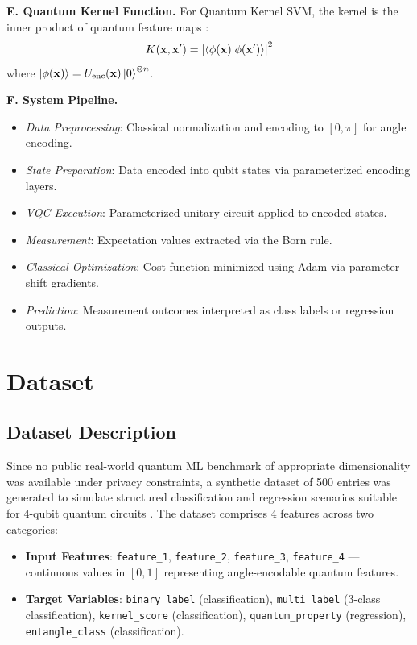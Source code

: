 \documentclass[conference]{IEEEtran}
\begin{document}
\textbf{E. Quantum Kernel Function.} For Quantum Kernel SVM, the kernel is the inner product of quantum feature maps \cite{havlicek2019}:
\[
K(\mathbf{x}, \mathbf{x}') = \left|\braket{\phi(\mathbf{x})|\phi(\mathbf{x}')}\right|^2
\]
where $\ket{\phi(\mathbf{x})} = U_\text{enc}(\mathbf{x})\ket{0}^{\otimes n}$.

\textbf{F. System Pipeline.}
\begin{itemize}
  \item \textit{Data Preprocessing}: Classical normalization and encoding to $[0, \pi]$ for angle encoding.
  \item \textit{State Preparation}: Data encoded into qubit states via parameterized encoding layers.
  \item \textit{VQC Execution}: Parameterized unitary circuit applied to encoded states.
  \item \textit{Measurement}: Expectation values extracted via the Born rule.
  \item \textit{Classical Optimization}: Cost function minimized using Adam via parameter-shift gradients.
  \item \textit{Prediction}: Measurement outcomes interpreted as class labels or regression outputs.
\end{itemize}

\section{Dataset}

\subsection{Dataset Description}

Since no public real-world quantum ML benchmark of appropriate dimensionality was available under privacy constraints, a synthetic dataset of 500 entries was generated to simulate structured classification and regression scenarios suitable for 4-qubit quantum circuits \cite{mitarai2018}. The dataset comprises 4 features across two categories:

\begin{itemize}
  \item \textbf{Input Features}: \texttt{feature\_1}, \texttt{feature\_2}, \texttt{feature\_3}, \texttt{feature\_4} --- continuous values in $[0,1]$ representing angle-encodable quantum features.
  \item \textbf{Target Variables}: \texttt{binary\_label} (classification), \texttt{multi\_label} (3-class classification), \texttt{kernel\_score} (classification), \texttt{quantum\_property} (regression), \texttt{entangle\_class} (classification).
\end{itemize}
\end{document}
